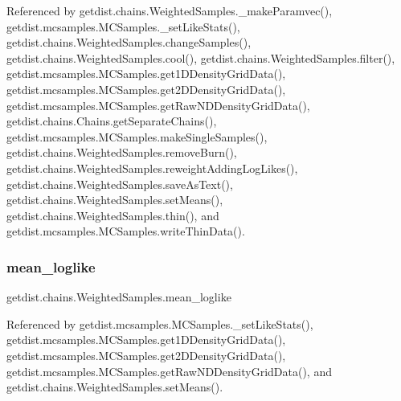Referenced by getdist.\+chains.\+Weighted\+Samples.\+\_\+make\+Paramvec(), getdist.\+mcsamples.\+M\+C\+Samples.\+\_\+set\+Like\+Stats(), getdist.\+chains.\+Weighted\+Samples.\+change\+Samples(), getdist.\+chains.\+Weighted\+Samples.\+cool(), getdist.\+chains.\+Weighted\+Samples.\+filter(), getdist.\+mcsamples.\+M\+C\+Samples.\+get1\+D\+Density\+Grid\+Data(), getdist.\+mcsamples.\+M\+C\+Samples.\+get2\+D\+Density\+Grid\+Data(), getdist.\+mcsamples.\+M\+C\+Samples.\+get\+Raw\+N\+D\+Density\+Grid\+Data(), getdist.\+chains.\+Chains.\+get\+Separate\+Chains(), getdist.\+mcsamples.\+M\+C\+Samples.\+make\+Single\+Samples(), getdist.\+chains.\+Weighted\+Samples.\+remove\+Burn(), getdist.\+chains.\+Weighted\+Samples.\+reweight\+Adding\+Log\+Likes(), getdist.\+chains.\+Weighted\+Samples.\+save\+As\+Text(), getdist.\+chains.\+Weighted\+Samples.\+set\+Means(), getdist.\+chains.\+Weighted\+Samples.\+thin(), and getdist.\+mcsamples.\+M\+C\+Samples.\+write\+Thin\+Data().

\mbox{\label{classgetdist_1_1chains_1_1WeightedSamples_aea57e7e62ea049618eb74ccbcb7ed4d0}} 
\subsubsection{\texorpdfstring{mean\+\_\+loglike}{mean\_loglike}}
{\footnotesize\ttfamily getdist.\+chains.\+Weighted\+Samples.\+mean\+\_\+loglike}



Referenced by getdist.\+mcsamples.\+M\+C\+Samples.\+\_\+set\+Like\+Stats(), getdist.\+mcsamples.\+M\+C\+Samples.\+get1\+D\+Density\+Grid\+Data(), getdist.\+mcsamples.\+M\+C\+Samples.\+get2\+D\+Density\+Grid\+Data(), getdist.\+mcsamples.\+M\+C\+Samples.\+get\+Raw\+N\+D\+Density\+Grid\+Data(), and getdist.\+chains.\+Weighted\+Samples.\+set\+Means().

\mbox{\label{classgetdist_1_1chains_1_1WeightedSamples_ab1a8c8e1397e28d9b340fbd573d95831}} 
